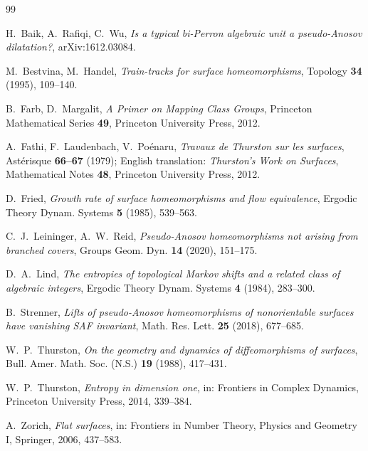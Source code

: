 \documentclass[11pt]{article}
\theoremstyle{plain}
\theoremstyle{definition}
\theoremstyle{remark}
\begin{document}
\begin{thebibliography}{99}

 H.~Baik, A.~Rafiqi, C.~Wu,
\emph{Is a typical bi-Perron algebraic unit a pseudo-Anosov dilatation?},
arXiv:1612.03084.

 M.~Bestvina, M.~Handel,
\emph{Train-tracks for surface homeomorphisms},
Topology \textbf{34} (1995), 109--140.

 B.~Farb, D.~Margalit,
\emph{A Primer on Mapping Class Groups},
Princeton Mathematical Series \textbf{49}, Princeton University Press, 2012.

 A.~Fathi, F.~Laudenbach, V.~Poénaru,
\emph{Travaux de Thurston sur les surfaces},
Astérisque \textbf{66--67} (1979);
English translation: \emph{Thurston's Work on Surfaces},
Mathematical Notes \textbf{48}, Princeton University Press, 2012.

 D.~Fried,
\emph{Growth rate of surface homeomorphisms and flow equivalence},
Ergodic Theory Dynam. Systems \textbf{5} (1985), 539--563.

 C.~J.~Leininger, A.~W.~Reid,
\emph{Pseudo-Anosov homeomorphisms not arising from branched covers},
Groups Geom. Dyn. \textbf{14} (2020), 151--175.

 D.~A.~Lind,
\emph{The entropies of topological Markov shifts and a related class of algebraic
integers},
Ergodic Theory Dynam. Systems \textbf{4} (1984), 283--300.

 B.~Strenner,
\emph{Lifts of pseudo-Anosov homeomorphisms of nonorientable surfaces have
vanishing SAF invariant},
Math. Res. Lett. \textbf{25} (2018), 677--685.

 W.~P.~Thurston,
\emph{On the geometry and dynamics of diffeomorphisms of surfaces},
Bull. Amer. Math. Soc. (N.S.) \textbf{19} (1988), 417--431.

 W.~P.~Thurston,
\emph{Entropy in dimension one}, in:
Frontiers in Complex Dynamics, Princeton University Press, 2014, 339--384.

 A.~Zorich,
\emph{Flat surfaces}, in:
Frontiers in Number Theory, Physics and Geometry I, Springer, 2006, 437--583.

\end{thebibliography}
\end{document}
